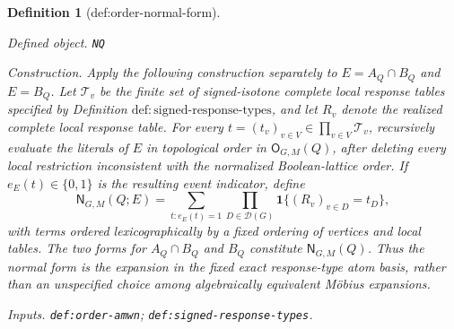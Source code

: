 \documentclass{article}
\newtheorem{definition}{Definition}
\begin{document}
\begin{definition}[def:order-normal-form]\label{def:order-normal-form}
\par\smallskip\noindent\emph{Defined object.} \texttt{NQ}
\par\smallskip\noindent\emph{Construction.} Apply the following construction separately to \(E=A_Q\cap B_Q\) and \(E=B_Q\). Let \(\mathcal T_v\) be the finite set of signed-isotone complete local response tables specified by Definition \(\mathrm{def:signed\text{-}response\text{-}types}\), and let \(R_v\) denote the realized complete local response table. For every \(t=(t_v)_{v\in V}\in\prod_{v\in V}\mathcal T_v\), recursively evaluate the literals of \(E\) in topological order in \(\mathsf O_{G,M}(Q)\), after deleting every local restriction inconsistent with the normalized Boolean-lattice order. If \(e_E(t)\in\{0,1\}\) is the resulting event indicator, define
\[
 \mathsf N_{G,M}(Q;E)
 =\sum_{t:e_E(t)=1}\prod_{D\in\mathcal D(G)}
 \mathbf 1\{(R_v)_{v\in D}=t_D\},
\]
with terms ordered lexicographically by a fixed ordering of vertices and local tables. The two forms for \(A_Q\cap B_Q\) and \(B_Q\) constitute \(\mathsf N_{G,M}(Q)\). Thus the normal form is the expansion in the fixed exact response-type atom basis, rather than an unspecified choice among algebraically equivalent M\"obius expansions.
\par\smallskip\noindent\emph{Inputs.} \texttt{def:\allowbreak{}order-\allowbreak{}amwn}; \texttt{def:\allowbreak{}signed-\allowbreak{}response-\allowbreak{}types}.
\end{definition}
\end{document}
